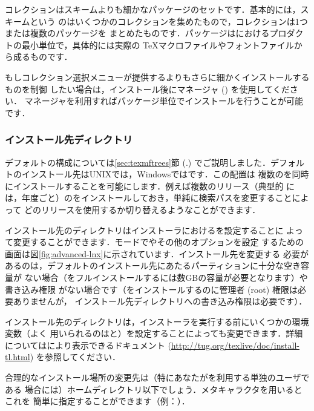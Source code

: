 \documentclass[uplatex,dvipdfmx]{jsarticle}
\begin{document}
コレクションはスキームよりも細かなパッケージのセットです．基本的には，スキームという
のはいくつかのコレクションを集めたもので，コレクションは1つまたは複数のパッケージを
まとめたものです．パッケージは\TL におけるプロダクトの最小単位で，具体的には実際の
\TeX マクロファイルやフォントファイルから成るものです．

もしコレクション選択メニューが提供するよりもさらに細かくインストールするものを制御
したい場合は，インストール後に\TL マネージャ () を使用してください．
\TL マネージャを利用すればパッケージ単位でインストールを行うことが可能です．

\subsubsection{インストール先ディレクトリ}
\label{sec:directories}

デフォルトの\TL 構成については\ref{sec:texmftrees}節 (\p.\pageref{sec:texmftrees})
でご説明しました．デフォルトのインストール先はUNIXでは，Windowsではです．この配置は
複数の\TL を同時にインストールすることを可能にします．例えば複数のリリース（典型的
には，年度ごと）の\TL をインストールしておき，単純に検索パスを変更することによって
どのリリースを使用するか切り替えるようなことができます．

インストール先のディレクトリはインストーラにおけるを設定することに
よって変更することができます．\GUI モードでやその他のオプションを設定
するための画面は図\ref{fig:advanced-lnx}に示されています．インストール先を変更する
必要があるのは，デフォルトのインストール先にあたるパーティションに十分な空き容量が
ない場合（\TL をフルインストールするには数GBの容量が必要となります）や書き込み権限
がない場合です（\TL をインストールするのに管理者 (root) 権限は必要ありませんが，
インストール先ディレクトリへの書き込み権限は必要です）．

インストール先のディレクトリは，インストーラを実行する前にいくつかの環境変数（よく
用いられるのはと）を設定することによっても変更できます．詳細についてはにより表示できるドキュメント (\url{http://tug.org/texlive/doc/install-tl.html})
を参照してください．

合理的なインストール場所の変更先は（特にあなたが\TL を利用する単独のユーザである
場合には）ホームディレクトリ以下でしょう．メタキャラクタ\code{\tl}を用いるとこれを
簡単に指定することができます（例：）．
\end{document}
